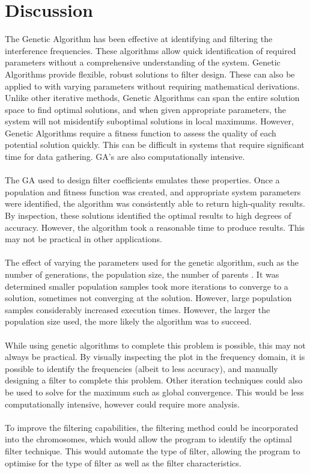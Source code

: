 \documentclass[a4paper, 11pt]{article}
\begin{document}
\section{Discussion}\label{sec:dis}
    The Genetic Algorithm has been effective at identifying and filtering the interference frequencies. These algorithms 
    allow quick identification of required parameters without a comprehensive understanding of the system. Genetic Algorithms 
    provide flexible, robust solutions to filter design. These can also be applied to with varying parameters without requiring
    mathematical derivations. Unlike other iterative methods, Genetic Algorithms can span the entire solution space to find
    optimal solutions, and when given appropriate parameters, the system will not misidentify suboptimal solutions in local
    maximums. However, Genetic Algorithms require a fitness function to assess the quality of each potential solution quickly. 
    This can be difficult in systems that require significant time for data gathering. GA's are also computationally intensive.
    \\\\
    The GA used to design filter coefficients emulates these properties. Once a population and fitness function was created,
    and appropriate system parameters were identified, the algorithm was consistently able to return high-quality results. 
    By inspection, these solutions identified the optimal results to high degrees of accuracy. However, the algorithm took
    a reasonable time to produce results. This may not be practical in other applications. 
    \\\\
    The effect of varying the parameters used for  the genetic algorithm, such as the number of generations, the population
    size, the number of parents \cite{Garip2018}. It was determined smaller population samples took more iterations to converge
    to a solution, sometimes not converging at the solution. However, large population samples considerably increased execution times. However, the larger the population
    size used, the more likely the algorithm was to succeed. 
    \\\\
    While using genetic algorithms to complete this problem is possible, this may not always be practical. By visually inspecting
    the plot in the frequency domain, it is possible to identify the frequencies (albeit to less accuracy), and manually designing
    a filter to complete this problem. Other iteration techniques could also be used to solve for the maximum such as global convergence.
    This would be less computationally intensive, however could require more analysis. 
    \\\\
    To improve the filtering capabilities, the filtering method could be incorporated into the chromosomes, which
    would allow the program to identify the optimal filter technique. This would automate the type of filter, allowing
    the program to optimise for the type of filter as well as the filter characteristics. 
\end{document}
